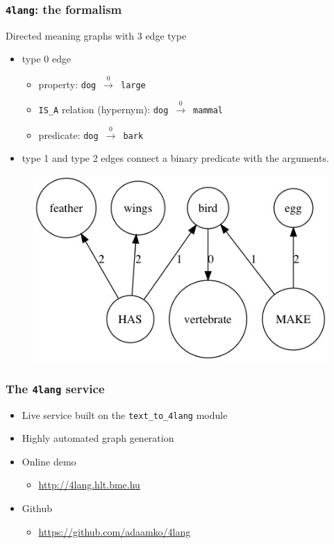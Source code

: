 \documentclass[bigger]{beamer}
\newcommand{\tefl}{\texttt{text\_to\_4lang}\xspace}
\newcommand{\fl}{\texttt{4lang}\xspace}
\begin{document}
{

\begin{frame}
    \frametitle{\fl: the formalism \citep{Kornai:2010,Kornai:2015a}}
\pause Directed meaning graphs with 3 edge type
\begin{itemize}
    \pause \item type 0 edge
        \begin{itemize}
            \pause \item property: \texttt{dog}~$\xrightarrow0$~\texttt{large}
            \pause \item \texttt{IS\_A} relation (hypernym): \texttt{dog}~$\xrightarrow0$~\texttt{mammal}
            \pause \item predicate: \texttt{dog}~$\xrightarrow0$~\texttt{bark}
        \end{itemize}
    \pause \item type 1 and type 2 edges connect a binary predicate with the arguments.
\end{itemize}
\pause \begin{figure}
\centering
    \includegraphics[scale=0.385]{pics/bird.jpg}
\end{figure}
\end{frame}
}
\begin{frame}
\frametitle{The \fl service}
		\begin{itemize}
			\pause \item Live service built on the \tefl module
			\pause \item Highly automated graph generation
			\pause \item Online demo
			\begin{itemize}
				 \item \url{http://4lang.hlt.bme.hu}
			\end{itemize}
			\pause \item Github
			\begin{itemize}
				\item \url{https://github.com/adaamko/4lang}
			\end{itemize}
		\end{itemize}

\end{frame}
\end{document}
